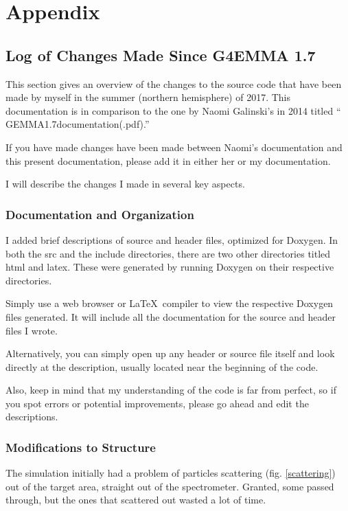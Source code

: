 \documentclass{article}
\newcommand{\filefont}[1]{{\fontfamily{pnc}\selectfont #1}\xspace}
\begin{document}
\section{Appendix}

\subsection{Log of Changes Made Since G4EMMA 1.7}

This section gives an overview of the changes to the source code that have been made by myself in the summer (northern hemisphere) of 2017. This documentation is in comparison to the one by Naomi Galinski's in 2014 titled `` GEMMA1.7documentation(.pdf).'' 

If you have made changes have been made between Naomi's documentation and this present documentation, please add it in either her or my documentation. 

I will describe the changes I made in several key aspects. 

\subsubsection{Documentation and Organization}

I added brief descriptions of source and header files, optimized for Doxygen. In both the \filefont{src} and the \filefont{include} directories, there are two other directories titled \filefont{html} and \filefont{latex}. These were generated by running Doxygen on their respective directories.

Simply use a web browser or \LaTeX\ compiler to view the respective Doxygen files generated. It will include all the documentation for the source and header files I wrote. 

Alternatively, you can simply open up any header or source file itself and look directly at the description, usually located near the beginning of the code. 

Also, keep in mind that my understanding of the code is far from perfect, so if you spot errors or potential improvements, please go ahead and edit the descriptions. 


\subsubsection{Modifications to Structure}

The simulation initially had a problem of particles scattering (fig. \ref{scattering}) out of the target area, straight out of the spectrometer. Granted, some passed through, but the ones that scattered out wasted a lot of time. 
\end{document}
